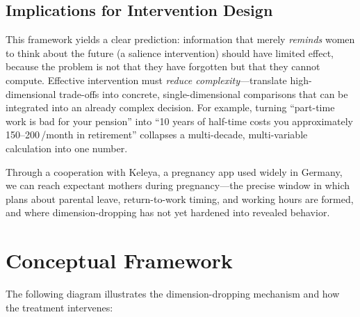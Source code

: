 \documentclass[12pt,a4paper]{article}
\begin{document}
\subsection{Implications for Intervention Design}

This framework yields a clear prediction: information that merely \emph{reminds} women to think about the future (a salience intervention) should have limited effect, because the problem is not that they have forgotten but that they cannot compute. Effective intervention must \emph{reduce complexity}---translate high-dimensional trade-offs into concrete, single-dimensional comparisons that can be integrated into an already complex decision. For example, turning ``part-time work is bad for your pension'' into ``10 years of half-time costs you approximately 150--200\,\texteuro/month in retirement'' collapses a multi-decade, multi-variable calculation into one number.

Through a cooperation with Keleya, a pregnancy app used widely in Germany, we can reach expectant mothers during pregnancy---the precise window in which plans about parental leave, return-to-work timing, and working hours are formed, and where dimension-dropping has not yet hardened into revealed behavior.

\section{Conceptual Framework}

The following diagram illustrates the dimension-dropping mechanism and how the treatment intervenes:
\end{document}
